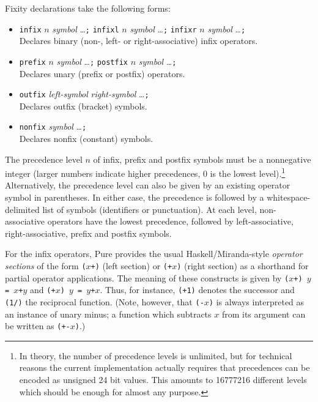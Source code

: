 \documentclass[a4paper,12pt]{article}
\newcommand{\nt}[1]{\textrm{\textit{#1\/}}}
\begin{document}
Fixity declarations take the following forms:

\begin{itemize}
\item \lstinline{infix} $n$ \nt{symbol} \ldots\verb|;| \lstinline{infixl} $n$ \nt{symbol} \ldots\verb|;| \lstinline{infixr} $n$ \nt{symbol} \ldots\verb|;|\\ Declares binary (non-, left- or right-associative) infix operators.
\item \lstinline{prefix} $n$ \nt{symbol} \ldots\verb|;| \lstinline{postfix} $n$ \nt{symbol} \ldots\verb|;|\\ Declares unary (prefix or postfix) operators.
\item \lstinline{outfix} \nt{left-symbol} \nt{right-symbol} \ldots\verb|;|\\ Declares outfix (bracket) symbols.
\item \lstinline{nonfix} \nt{symbol} \ldots\verb|;|\\ Declares nonfix (constant) symbols.
\end{itemize}

The precedence level $n$ of infix, prefix and postfix symbols must be a nonnegative integer (larger numbers indicate higher precedences, 0 is the lowest level).\footnote{In theory, the number of precedence levels is unlimited, but for technical reasons the current implementation actually requires that precedences can be encoded as unsigned 24 bit values. This amounts to 16777216 different levels which should be enough for almost any purpose.} Alternatively, the precedence level can also be given by an existing operator symbol in parentheses. In either case, the precedence is followed by a whitespace-delimited list of symbols (identifiers or punctuation). At each level, non-associative operators have the lowest precedence, followed by left-associative, right-associative, prefix and postfix symbols.

For the infix operators, Pure provides the usual Haskell/Miranda-style \emph{operator sections} of the form \texttt{($x$+)} (left section) or \texttt{(+$x$)} (right section) as a shorthand for partial operator applications. The meaning of these constructs is given by \texttt{($x$+) $y$ = $x$+$y$} and \texttt{(+$x$) $y$ = $y$+$x$}. Thus, for instance, \texttt{(+1)} denotes the successor and \texttt{(1/)} the reciprocal function. (Note, however, that \texttt{(-$x$)} is always interpreted as an instance of unary minus; a function which subtracts $x$ from its argument can be written as \texttt{(+-$x$)}.)
\end{document}
